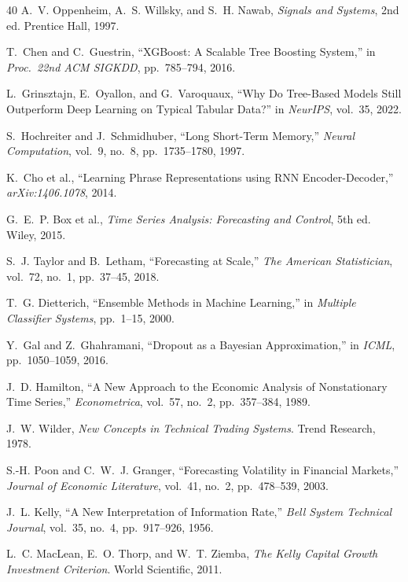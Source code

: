 \documentclass[12pt,a4paper]{article}
\begin{document}
\begin{thebibliography}{40}
A.~V. Oppenheim, A.~S. Willsky, and S.~H. Nawab, \textit{Signals and Systems}, 2nd ed. Prentice Hall, 1997.

T.~Chen and C.~Guestrin, ``XGBoost: A Scalable Tree Boosting System,'' in \textit{Proc.~22nd ACM SIGKDD}, pp.~785--794, 2016.

L.~Grinsztajn, E.~Oyallon, and G.~Varoquaux, ``Why Do Tree-Based Models Still Outperform Deep Learning on Typical Tabular Data?'' in \textit{NeurIPS}, vol.~35, 2022.

S.~Hochreiter and J.~Schmidhuber, ``Long Short-Term Memory,'' \textit{Neural Computation}, vol.~9, no.~8, pp.~1735--1780, 1997.

K.~Cho et al., ``Learning Phrase Representations using RNN Encoder-Decoder,'' \textit{arXiv:1406.1078}, 2014.

G.~E.~P. Box et al., \textit{Time Series Analysis: Forecasting and Control}, 5th ed. Wiley, 2015.

S.~J. Taylor and B.~Letham, ``Forecasting at Scale,'' \textit{The American Statistician}, vol.~72, no.~1, pp.~37--45, 2018.

T.~G. Dietterich, ``Ensemble Methods in Machine Learning,'' in \textit{Multiple Classifier Systems}, pp.~1--15, 2000.

Y.~Gal and Z.~Ghahramani, ``Dropout as a Bayesian Approximation,'' in \textit{ICML}, pp.~1050--1059, 2016.

J.~D. Hamilton, ``A New Approach to the Economic Analysis of Nonstationary Time Series,'' \textit{Econometrica}, vol.~57, no.~2, pp.~357--384, 1989.

J.~W. Wilder, \textit{New Concepts in Technical Trading Systems}. Trend Research, 1978.

S.-H. Poon and C.~W.~J. Granger, ``Forecasting Volatility in Financial Markets,'' \textit{Journal of Economic Literature}, vol.~41, no.~2, pp.~478--539, 2003.

J.~L. Kelly, ``A New Interpretation of Information Rate,'' \textit{Bell System Technical Journal}, vol.~35, no.~4, pp.~917--926, 1956.

L.~C. MacLean, E.~O. Thorp, and W.~T. Ziemba, \textit{The Kelly Capital Growth Investment Criterion}. World Scientific, 2011.


\end{thebibliography}
\end{document}
